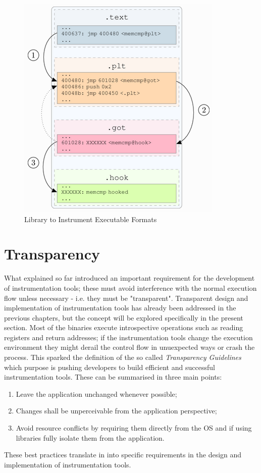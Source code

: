 \begin{figure}[!bpth]
    \begin{center}
        \includegraphics[scale=1.0]{./pics/lief.png}
        \caption{Library to Instrument Executable Formats}
        \label{LIEF}
    \end{center}
\end{figure}



\section{Transparency}
What explained so far introduced an important requirement for the development of instrumentation tools; these must avoid
interference with the normal execution flow unless necessary - i.e. they must be "transparent". Transparent design and
implementation of instrumentation tools has already been addressed in the previous chapters, but the concept will be
explored specifically in the present section. Most of the binaries execute introspective operations such as reading
registers and return addresses; if the instrumentation tools change the execution environment they might derail the
control flow in unuexpected ways or crash the process. This sparked the definition of the so called \textit{Transparency
Guidelines} which purpose is pushing developers to build efficient and successful instrumentation tools. These can be
summarised in three main points:
\begin{enumerate}
    \item Leave the application unchanged whenever possible;
    \item Changes shall be unperceivable from the application perspective;
    \item Avoid resource conflicts by requiring them directly from the OS and if using libraries fully isolate them from
        the application.
\end{enumerate}
These best practices translate in into specific requirements in the design and implementation of instrumentation tools.


